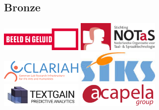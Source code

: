 \subsection*{Bronze}
\begin{center}
    \includegraphics[width=0.3\textwidth]{logo_beeld_geluid} \hspace{2cm}
    \includegraphics[width=0.3\textwidth]{logo_NOTaS} \\[2cm]
    \includegraphics[width=0.3\textwidth]{logo_clariah} \hspace{2cm}
    \includegraphics[width=0.3\textwidth]{siks-logo} \\[2cm]
    \includegraphics[width=0.3\textwidth]{textgainlogo} \hspace{2cm}
    \includegraphics[width=0.3\textwidth]{logoAG_XL}
\end{center}
